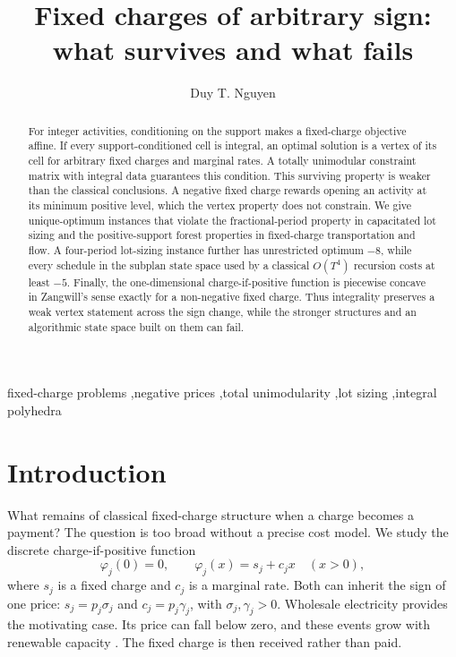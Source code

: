\documentclass[3p,11pt]{elsarticle}
\theoremstyle{remark}
\theoremstyle{definition}
\begin{document}
\begin{frontmatter}
\title{Fixed charges of arbitrary sign: what survives and what fails}
\author{Duy T. Nguyen}
\address{Independent Researcher, Ho Chi Minh City, Vietnam}

\begin{abstract}
For integer activities, conditioning on the support makes a fixed-charge objective
affine. If every support-conditioned cell is integral, an optimal solution is a vertex
of its cell for arbitrary fixed charges and marginal rates. A totally unimodular
constraint matrix with integral data guarantees this condition. This
surviving property is weaker than the classical conclusions. A negative fixed charge
rewards opening an activity at its minimum positive level, which the vertex property does
not constrain. We give unique-optimum instances that violate the fractional-period
property in capacitated lot sizing and the positive-support forest properties in
fixed-charge transportation and flow. A four-period lot-sizing instance further has
unrestricted optimum $-8$, while every schedule in the subplan state space used by a
classical $O(T^4)$ recursion costs at least $-5$. Finally, the one-dimensional
charge-if-positive function is piecewise concave in Zangwill's sense exactly for a
non-negative fixed charge. Thus integrality preserves a weak vertex statement across the
sign change, while the stronger structures and an algorithmic state space built on them
can fail.
\end{abstract}

\begin{keyword}
fixed-charge problems \sep negative prices \sep total unimodularity \sep lot sizing
\sep integral polyhedra
\end{keyword}
\end{frontmatter}
\linenumbers

\section{Introduction}

What remains of classical fixed-charge structure when a charge becomes a payment? The
question is too broad without a precise cost model. We study the discrete
charge-if-positive function
\begin{equation}\label{eq:fc}
\varphi_j(0)=0,\qquad \varphi_j(x)=s_j+c_jx\quad(x>0),
\end{equation}
where $s_j$ is a fixed charge and $c_j$ is a marginal rate. Both can inherit the sign of
one price: $s_j=p_j\sigma_j$ and $c_j=p_j\gamma_j$, with
$\sigma_j,\gamma_j>0$. Wholesale electricity provides the motivating case. Its price can
fall below zero, and these events grow with renewable capacity \cite{seel21}. The fixed
charge is then received rather than paid.
\end{document}

